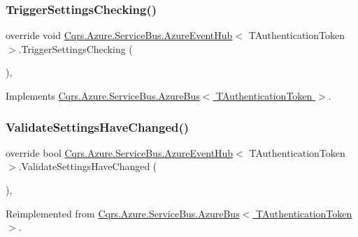 \subsubsection{\texorpdfstring{Trigger\+Settings\+Checking()}{TriggerSettingsChecking()}}
{\footnotesize\ttfamily override void \hyperlink{classCqrs_1_1Azure_1_1ServiceBus_1_1AzureEventHub}{Cqrs.\+Azure.\+Service\+Bus.\+Azure\+Event\+Hub}$<$ T\+Authentication\+Token $>$.Trigger\+Settings\+Checking (\begin{DoxyParamCaption}{ }\end{DoxyParamCaption})\hspace{0.3cm}{\ttfamily [protected]}, {\ttfamily [virtual]}}



Implements \hyperlink{classCqrs_1_1Azure_1_1ServiceBus_1_1AzureBus_ae501f84c4983bfa3b2ae4551749ac998}{Cqrs.\+Azure.\+Service\+Bus.\+Azure\+Bus$<$ T\+Authentication\+Token $>$}.

\mbox{\label{classCqrs_1_1Azure_1_1ServiceBus_1_1AzureEventHub_afe8d6f93f97ab5658b81903af555632c}} 
\subsubsection{\texorpdfstring{Validate\+Settings\+Have\+Changed()}{ValidateSettingsHaveChanged()}}
{\footnotesize\ttfamily override bool \hyperlink{classCqrs_1_1Azure_1_1ServiceBus_1_1AzureEventHub}{Cqrs.\+Azure.\+Service\+Bus.\+Azure\+Event\+Hub}$<$ T\+Authentication\+Token $>$.Validate\+Settings\+Have\+Changed (\begin{DoxyParamCaption}{ }\end{DoxyParamCaption})\hspace{0.3cm}{\ttfamily [protected]}, {\ttfamily [virtual]}}



Reimplemented from \hyperlink{classCqrs_1_1Azure_1_1ServiceBus_1_1AzureBus_a9fa1f5a74819100c40d8079ac6a6adb9}{Cqrs.\+Azure.\+Service\+Bus.\+Azure\+Bus$<$ T\+Authentication\+Token $>$}.



